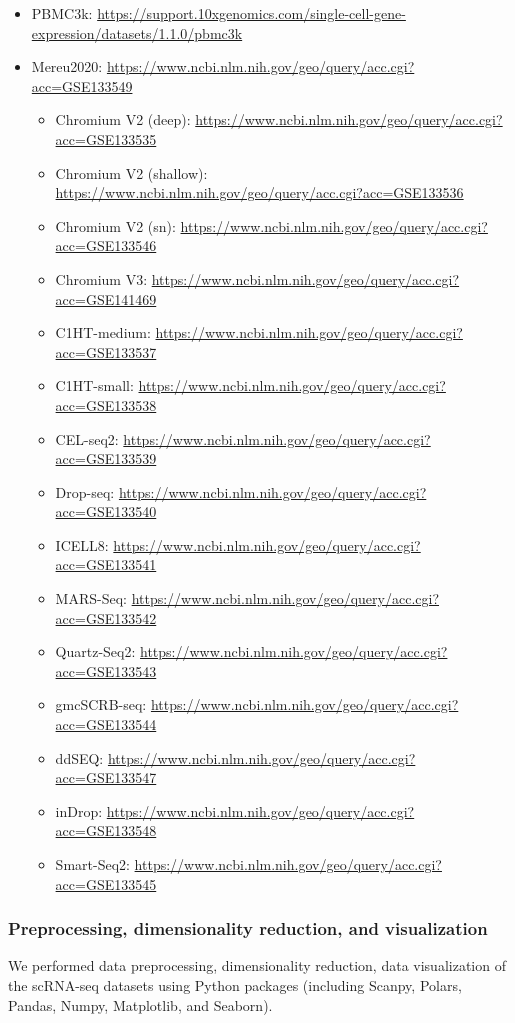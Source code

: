 \documentclass{article}
\begin{document}
\begin{itemize}
  \item PBMC3k: \url{https://support.10xgenomics.com/single-cell-gene-expression/datasets/1.1.0/pbmc3k}
  \item Mereu2020: \url{https://www.ncbi.nlm.nih.gov/geo/query/acc.cgi?acc=GSE133549}
  \begin{itemize}
    \item Chromium V2 (deep): \url{https://www.ncbi.nlm.nih.gov/geo/query/acc.cgi?acc=GSE133535}
    \item Chromium V2 (shallow): \url{https://www.ncbi.nlm.nih.gov/geo/query/acc.cgi?acc=GSE133536}
    \item Chromium V2 (sn): \url{https://www.ncbi.nlm.nih.gov/geo/query/acc.cgi?acc=GSE133546}
    \item Chromium V3: \url{https://www.ncbi.nlm.nih.gov/geo/query/acc.cgi?acc=GSE141469}
    \item C1HT-medium: \url{https://www.ncbi.nlm.nih.gov/geo/query/acc.cgi?acc=GSE133537}
    \item C1HT-small: \url{https://www.ncbi.nlm.nih.gov/geo/query/acc.cgi?acc=GSE133538}
    \item CEL-seq2: \url{https://www.ncbi.nlm.nih.gov/geo/query/acc.cgi?acc=GSE133539}
    \item Drop-seq: \url{https://www.ncbi.nlm.nih.gov/geo/query/acc.cgi?acc=GSE133540}
    \item ICELL8: \url{https://www.ncbi.nlm.nih.gov/geo/query/acc.cgi?acc=GSE133541}
    \item MARS-Seq: \url{https://www.ncbi.nlm.nih.gov/geo/query/acc.cgi?acc=GSE133542}
    \item Quartz-Seq2: \url{https://www.ncbi.nlm.nih.gov/geo/query/acc.cgi?acc=GSE133543}
    \item gmcSCRB-seq: \url{https://www.ncbi.nlm.nih.gov/geo/query/acc.cgi?acc=GSE133544}
    \item ddSEQ: \url{https://www.ncbi.nlm.nih.gov/geo/query/acc.cgi?acc=GSE133547}
    \item inDrop: \url{https://www.ncbi.nlm.nih.gov/geo/query/acc.cgi?acc=GSE133548}
    \item Smart-Seq2: \url{https://www.ncbi.nlm.nih.gov/geo/query/acc.cgi?acc=GSE133545}
  \end{itemize}
\end{itemize}

\subsubsection*{Preprocessing, dimensionality reduction, and visualization}
We performed data preprocessing, dimensionality reduction, data visualization
of the scRNA-seq datasets using Python packages (including Scanpy\cite{scanpy}, Polars\cite{polars},
Pandas, Numpy, Matplotlib\cite{matplotlib}, and Seaborn\cite{seaborn}).
\end{document}

